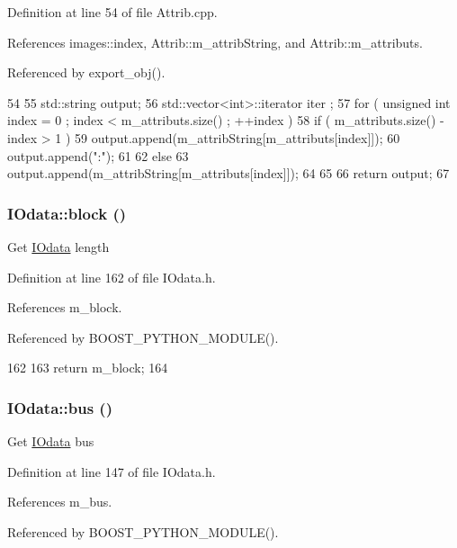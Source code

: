 Definition at line 54 of file Attrib.cpp.

References images::index, Attrib::m\_\-attribString, and Attrib::m\_\-attributs.

Referenced by export\_\-obj().


\begin{DoxyCode}
54                             {
55   std::string output;
56   std::vector<int>::iterator iter ;
57   for ( unsigned int index = 0 ; index < m_attributs.size() ; ++index ) {
58     if ( m_attributs.size() - index > 1 ) {
59       output.append(m_attribString[m_attributs[index]]);
60       output.append(":");
61     }
62     else {
63       output.append(m_attribString[m_attributs[index]]);
64     }
65   }
66   return output;
67 }
\end{DoxyCode}
\hypertarget{classIOdata_aeda27840c9a9b7b3b86efc71c56cd868}{
\subsubsection[{block}]{ IOdata::block ()}}
\label{classIOdata_aeda27840c9a9b7b3b86efc71c56cd868}
Get \hyperlink{classIOdata}{IOdata} length 

Definition at line 162 of file IOdata.h.

References m\_\-block.

Referenced by BOOST\_\-PYTHON\_\-MODULE().


\begin{DoxyCode}
162              {
163     return m_block;
164   }
\end{DoxyCode}
\hypertarget{classIOdata_ab904bcca0e8e3bebc3299e47ca93a8a1}{
\subsubsection[{bus}]{ IOdata::bus ()}}
\label{classIOdata_ab904bcca0e8e3bebc3299e47ca93a8a1}
Get \hyperlink{classIOdata}{IOdata} bus 

Definition at line 147 of file IOdata.h.

References m\_\-bus.

Referenced by BOOST\_\-PYTHON\_\-MODULE().


